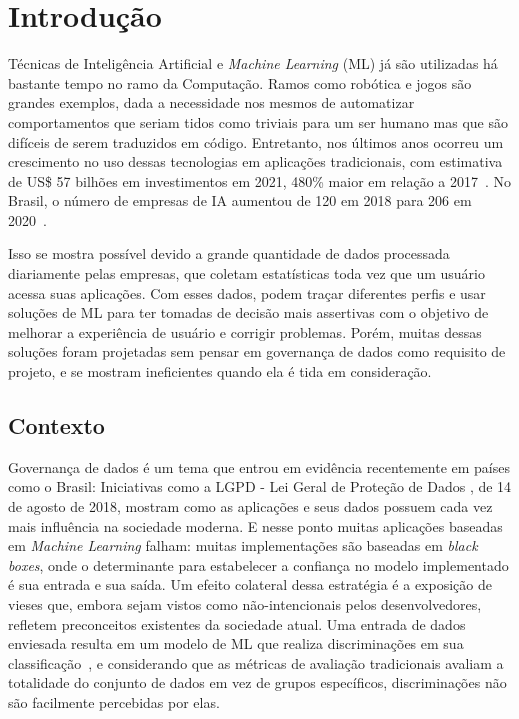 \documentclass[portugues]{ic-tese}
\begin{document}
\mainmatter


\chapter{Introdução}


Técnicas de Inteligência Artificial e \textit{Machine Learning} (ML) já são utilizadas há bastante tempo no ramo da Computação. Ramos como robótica e jogos são grandes exemplos, dada a necessidade nos mesmos de automatizar comportamentos que seriam tidos como triviais para um ser humano mas que são difíceis de serem traduzidos em código. Entretanto, nos últimos anos ocorreu um crescimento no uso dessas tecnologias em aplicações tradicionais, com estimativa de US\$ 57 bilhões em investimentos em 2021, 480\% maior em relação a 2017~\citep{Deloitte_2018}. No Brasil, o número de empresas de IA aumentou de 120 em 2018 para 206 em 2020~\citep{CIO_2021}.

Isso se mostra possível devido a grande quantidade de dados processada diariamente pelas empresas, que coletam estatísticas toda vez que um usuário acessa suas aplicações. Com esses dados, podem traçar diferentes perfis e usar soluções de ML para ter tomadas de decisão mais assertivas com o objetivo de melhorar a experiência de usuário e corrigir problemas. Porém, muitas dessas soluções foram projetadas sem pensar em governança de dados como requisito de projeto, e se mostram ineficientes quando ela é tida em consideração.

\section{Contexto}

Governança de dados é um tema que entrou em evidência recentemente em países como o Brasil: Iniciativas como a LGPD - Lei Geral de Proteção de Dados \citep{LGPD_2021}, de 14 de agosto de 2018, mostram como as aplicações e seus dados possuem cada vez mais influência na sociedade moderna. E nesse ponto muitas aplicações baseadas em \textit{Machine Learning} falham: muitas implementações são baseadas em \textit{black boxes}, onde o determinante para estabelecer a confiança no modelo implementado é sua entrada e sua saída. Um efeito colateral dessa estratégia é a exposição de vieses que, embora sejam vistos como não-intencionais pelos desenvolvedores, refletem preconceitos existentes da sociedade atual. Uma entrada de dados enviesada resulta em um modelo de ML que realiza discriminações em sua classificação~\citep{Buolamwini_2018}, e considerando que as métricas de avaliação tradicionais avaliam a totalidade do conjunto de dados em vez de grupos específicos, discriminações não são facilmente percebidas por elas.
\end{document}
